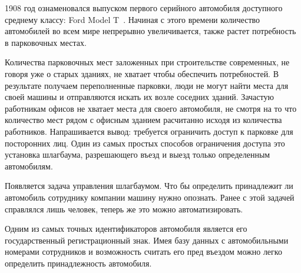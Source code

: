 \label{sec:intro}

1908 год ознаменовался выпуском первого серийного автомобиля доступного среднему классу: Ford Model T~\cite{ford_t}. Начиная с этого времени количество автомобилей во всем мире непрерывно увеличивается, также растет потребность в парковочных местах.

Количества парковочных мест заложенных при строительстве современных, не говоря уже о старых зданиях, не хватает чтобы обеспечить потребностей. В результате получаем переполненные парковки, люди не могут найти места для своей машины и отправляются искать их возле соседних зданий. Зачастую работникам офисов не хватает места для своего автомобиля, не смотря на то что количество мест рядом с офисным зданием расчитанно исходя из количества работников. Напрашивается вывод: требуется ограничить доступ к парковке для посторонних лиц. Один из самых простых способов ограничения доступа это установка шлагбаума, разрешающего въезд и выезд только определенным автомобилям.

Появляется задача управления шлагбаумом. Что бы определить принадлежит ли автомобиль сотруднику компании машину нужно опознать. Ранее с этой задачей справлялся лишь человек, теперь же это можно автоматизировать.

Одним из самых точных идентификаторов автомобиля является его государственный регистрационный знак. Имея базу данных с автомобильными номерами сотрудников и возможность считать его пред въездом можно легко определить принадлежность автомобиля.

